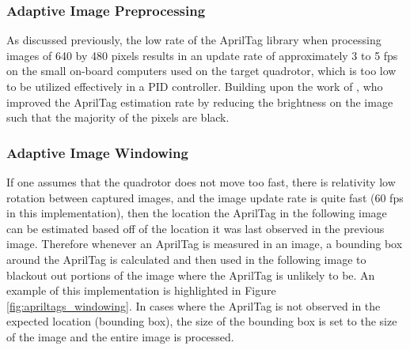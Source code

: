 \documentclass[11pt, twocolumn]{article}
\begin{document}
\subsubsection{Adaptive Image Preprocessing}
As discussed previously, the low rate of the AprilTag library when processing images of 640 by 480 pixels results in an update rate of approximately 3 to 5 fps on the small on-board computers used on the target quadrotor, which is too low to be utilized effectively in a PID controller. Building upon the work of \cite{Ling2014}, who improved the AprilTag estimation rate by reducing the brightness on the image such that the majority of the pixels are black.

\subsubsection{Adaptive Image Windowing}
If one assumes that the quadrotor does not move too fast, there is relativity low rotation between captured images, and the image update rate is quite fast (60 fps in this implementation), then the location the AprilTag in the following image can be estimated based off of the location it was last observed in the previous image. Therefore whenever an AprilTag is measured in an image, a bounding box around the AprilTag is calculated and then used in the following image to blackout out portions of the image where the AprilTag is unlikely to be. An example of this implementation is highlighted in Figure \ref{fig:apriltags_windowing}. In cases where the AprilTag is not observed in the expected location (bounding box), the size of the bounding box is set to the size of the image and the entire image is processed. 
\end{document}
